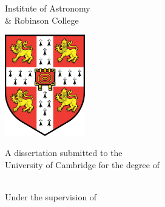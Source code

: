 \begin{titlepage}
    \begin{addmargin}[-1cm]{-3cm}
    \begin{center}

        \large 

        \hfill

        \vfill

        \begingroup
            \color{Maroon}\LARGE{\spacedallcaps{\myTitle}} \\ \bigskip
        \endgroup

        \vspace{2cm}

        {\LARGE \spacedallcaps{\myName}} \\
        {\Large Institute of Astronomy  \\
         \& Robinson College} \\

        \vfill

        \includegraphics[width=3.5cm]{figures/Cambridge_University_Crest_-_flat.png} \\ \medskip

        \vspace{1cm}

        A dissertation submitted to the \\
        University of Cambridge for the degree of \\
        {\Large {}} \\ \bigskip

        \vspace{1cm}

        Under the supervision of \\
        {\Large {} \\
         } \\


\end{center}
\end{addmargin}
\end{titlepage}
